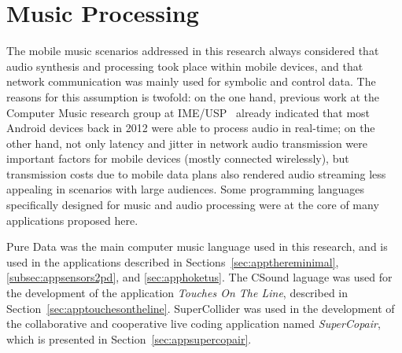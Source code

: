 \section{Music Processing}

The mobile music scenarios addressed in this research always considered that audio synthesis and processing took place within mobile devices, and that network communication was mainly used for symbolic and control data. The reasons for this assumption is twofold: on the one hand, previous work at the Computer Music research group at IME/USP~\citep{bianchi2014processamento} already indicated that most Android devices back in 2012 were able to process audio in real-time; on the other hand, not only latency and jitter in network audio transmission were important factors for mobile devices (mostly connected wirelessly), but transmission costs due to mobile data plans also rendered audio streaming less appealing in scenarios with large audiences. Some programming languages specifically designed for music and audio processing were at the core of many applications proposed here.


Pure Data was the main computer music language used in this research, and is used in the applications described in Sections~\ref{sec:appthereminimal}, \ref{subsec:appsensors2pd}, and \ref{sec:apphoketus}.
The CSound laguage was used for the development of the application \textit{Touches On The Line}, described in Section~\ref{sec:apptouchesontheline}.
SuperCollider was used in the development of the collaborative and cooperative live coding application named \textit{SuperCopair}, which is presented in Section~\ref{sec:appsupercopair}.

